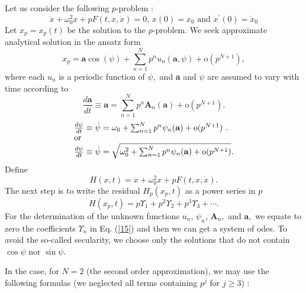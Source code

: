 \documentclass{ws-ijbc}
\begin{document}
\bigskip \noindent\noindent \noindent \noindent \noindent Let us consider
the following $p$-problem : 
\begin{equation}
\ddot{x}+\omega _{0}^{2}x+pF(t,x,\dot{x})=0\text{, }x(0)=x_{0}\text{ and }%
x^{\prime }(0)=\dot{x}_{0}  \label{suka1}
\end{equation}%
Let $x_{p}=x_{p}(t)$ be the solution to the $p$-problem. We seek approximate
analytical solution in the ansatz form%
\begin{equation}
x_{p}=\mathbf{a}\cos \left( \psi \right) +\sum_{n=1}^{N}p^{n}u_{n}(\mathbf{a}%
,\psi )+\text{o}(p^{N+1}),  \label{17}
\end{equation}%
where each $u_{n}$ is a periodic function of $\psi ,$ and \textbf{a} and $%
\psi $ are assumed to vary with time according to%
\begin{equation}
\frac{d\mathbf{a}}{dt}\equiv \mathbf{a}=\sum_{n=1}^{N}p^{n}\mathbf{A}_{n}(%
\mathbf{a})+\text{o}(p^{N+1}).  \label{s0}
\end{equation}%
\begin{equation}
\begin{tabular}{l}
$\frac{d\psi }{dt}\equiv \dot{\psi}=\omega _{0}+\sum_{n=1}^{N}p^{n}\psi _{n}(%
\mathbf{a})+\text{o}(p^{N+1})\text{ .}$ \\ 
or \\ 
$\frac{d\psi }{dt}\equiv \dot{\psi}=\sqrt{\omega
_{0}^{2}+\sum_{n=1}^{N}p^{n}\psi _{n}(\mathbf{a})+\text{o}(p^{N+1})}.$%
\end{tabular}
\label{s1}
\end{equation}%
Define%
\begin{equation}
H(x,t)=\ddot{x}+\omega _{0}^{2}x+pF(t,x,\dot{x}).  \label{s2}
\end{equation}%
The next step is to write the residual $H_{p}(x_{p},t)$ as a power series in 
$p$ 
\begin{equation}
H(x_{p},t)=p\Upsilon _{1}+p^{2}\Upsilon _{2}+p^{3}\Upsilon _{3}+\cdots .
\label{15}
\end{equation}%
For the determination of the unknown functions $u_{n}$, $\psi _{n}$, $%
\mathbf{A}_{n},$ and $\mathbf{a},$ we equate to zero the coefficients $%
\Upsilon _{n}$ in Eq. (\ref{15}) and then we can get a system of odes. To
avoid the so-called secularity, we choose only the solutions that do not
contain $\cos \psi $ nor $\sin \psi $. \ 

\noindent In the case, for $N=2$ (the second order approximation), we may
use the following formulas (we neglected all terms containing $p^{j}$ for $%
j\geq 3$) :
\end{document}
